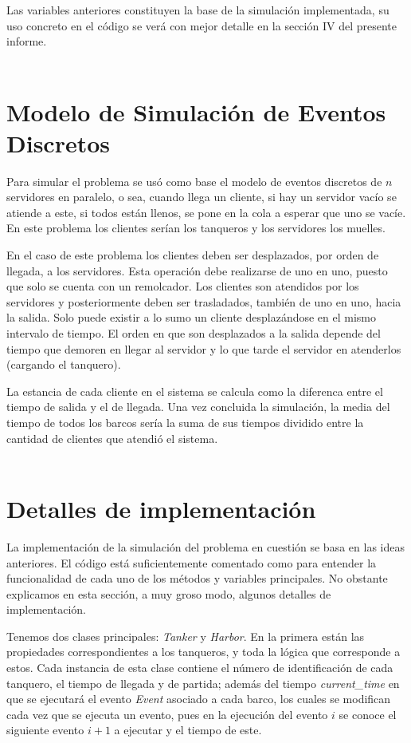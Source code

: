 \documentclass[twoside]{article}
\begin{document}
Las variables anteriores constituyen la base de la simulaci\'on implementada, su uso concreto en el c\'odigo se ver\'a con mejor detalle en la secci\'on IV del presente informe.\\\\


\section{Modelo de Simulaci\'on de Eventos Discretos}
Para simular el problema se us\'o como base el modelo de eventos discretos de $n$ servidores en paralelo, o sea, cuando llega un cliente, si hay un servidor vac\'io se atiende a este, si todos est\'an llenos, se pone en la cola a esperar que uno se vac\'ie. En este problema los clientes ser\'ian los tanqueros y los servidores los muelles.

En el caso de este problema los clientes deben ser desplazados, por orden de llegada, a los servidores. Esta operaci\'on debe realizarse de uno en uno, puesto que solo se cuenta con un remolcador. Los clientes son atendidos por los servidores y posteriormente deben ser trasladados, tambi\'en de uno en uno, hacia la salida. Solo puede existir a lo sumo un cliente desplaz\'andose en el mismo intervalo de tiempo. El orden en que son desplazados a la salida depende del tiempo que demoren en llegar al servidor y lo que tarde el servidor en atenderlos (cargando el tanquero).  

La estancia de cada cliente en el sistema se calcula como la diferenca entre el tiempo de salida y el de llegada. Una vez concluida la simulaci\'on, la media del tiempo de todos los barcos ser\'ia la suma de sus tiempos dividido entre la cantidad de clientes que atendi\'o el sistema.\\\\

\section{Detalles de implementaci\'on}
La implementaci\'on de la simulaci\'on del problema en cuesti\'on se basa en las ideas anteriores. El c\'odigo est\'a suficientemente comentado como para entender la funcionalidad de cada uno de los m\'etodos y variables principales. No obstante explicamos en esta secci\'on, a muy groso modo, algunos detalles de implementaci\'on.

Tenemos dos clases principales: \textit{Tanker} y \textit{Harbor}. En la primera est\'an las propiedades correspondientes a los tanqueros, y toda la l\'ogica que corresponde a estos. Cada instancia de esta clase contiene el n\'umero de identificaci\'on de cada tanquero, el tiempo de llegada y de partida; adem\'as del tiempo \textit{current\_time} en que se ejecutar\'a el evento \textit{Event} asociado a cada barco, los cuales se modifican cada vez que se ejecuta un evento, pues en la ejecuci\'on del evento $i$ se conoce el siguiente evento $i+1$ a ejecutar y el tiempo de este. 
\end{document}
